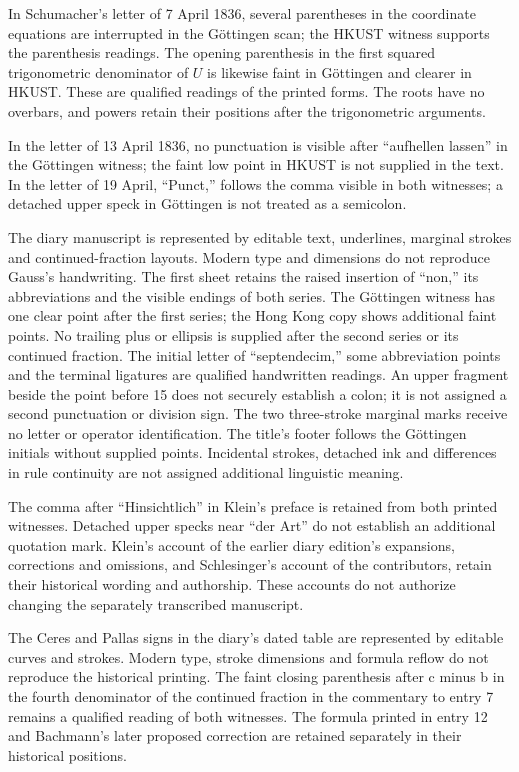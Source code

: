 In Schumacher’s letter of 7 April 1836, several parentheses in the coordinate equations are interrupted in the Göttingen scan; the HKUST witness supports the parenthesis readings. The opening parenthesis in the first squared trigonometric denominator of \(U\) is likewise faint in Göttingen and clearer in HKUST. These are qualified readings of the printed forms. The roots have no overbars, and powers retain their positions after the trigonometric arguments.

In the letter of 13 April 1836, no punctuation is visible after “aufhellen lassen” in the Göttingen witness; the faint low point in HKUST is not supplied in the text. In the letter of 19 April, “Punct,” follows the comma visible in both witnesses; a detached upper speck in Göttingen is not treated as a semicolon.

The diary manuscript is represented by editable text, underlines, marginal strokes and continued-fraction layouts. Modern type and dimensions do not reproduce Gauss’s handwriting. The first sheet retains the raised insertion of “non,” its abbreviations and the visible endings of both series. The Göttingen witness has one clear point after the first series; the Hong Kong copy shows additional faint points. No trailing plus or ellipsis is supplied after the second series or its continued fraction. The initial letter of “septendecim,” some abbreviation points and the terminal ligatures are qualified handwritten readings. An upper fragment beside the point before 15 does not securely establish a colon; it is not assigned a second punctuation or division sign. The two three-stroke marginal marks receive no letter or operator identification. The title’s footer follows the Göttingen initials without supplied points. Incidental strokes, detached ink and differences in rule continuity are not assigned additional linguistic meaning.

The comma after “Hinsichtlich” in Klein’s preface is retained from both printed witnesses. Detached upper specks near “der Art” do not establish an additional quotation mark. Klein’s account of the earlier diary edition’s expansions, corrections and omissions, and Schlesinger’s account of the contributors, retain their historical wording and authorship. These accounts do not authorize changing the separately transcribed manuscript.

The Ceres and Pallas signs in the diary’s dated table are represented by editable curves and strokes. Modern type, stroke dimensions and formula reflow do not reproduce the historical printing. The faint closing parenthesis after c minus b in the fourth denominator of the continued fraction in the commentary to entry 7 remains a qualified reading of both witnesses. The formula printed in entry 12 and Bachmann’s later proposed correction are retained separately in their historical positions.

